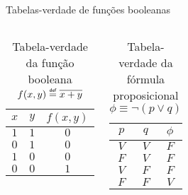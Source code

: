\expandafter\documentclass\expandafter[table, usenames, svgnames, dvipsnames,14pt, \classopts]{beamer}
\newcommand\defeq{\mathrel{\overset{\makebox[0pt]{\mbox{\normalfont\tiny\sffamily def}}}{=}}}
\begin{document}
\begin{frame}{Tabelas-verdade de funções booleanas}

    \begin{columns}[c]
            \begin{center}
                \begin{table}
                    \caption{Tabela-verdade da função booleana $f(x,y) \defeq \overline{x + y}$}
                    \vspace{1em}
                    \begin{tabular}{cc|c}
                        $x$ & $y$ & $f(x,y)$\\
                        \hline
                        $1$ & $1$ & $0$\\
                        $0$ & $1$ & $0$\\
                        $1$ & $0$ & $0$\\
                        $0$ & $0$ & $1$\\
                    \end{tabular}
                \end{table}
            \end{center}

            \begin{center}
                \begin{table}
                    \caption{Tabela-verdade da fórmula proposicional $\phi \equiv \lnot(p \lor q)$}
                    \vspace{1em}
                    \begin{tabular}{cc|c}
                        $p$ & $q$ & $\phi$\\
                        \hline
                        $V$ & $V$ & $F$\\
                        $F$ & $V$ & $F$\\
                        $V$ & $F$ & $F$\\
                        $F$ & $F$ & $V$\\
                    \end{tabular}
                \end{table}
            \end{center}
    \end{columns}
            
\end{frame}
\end{document}
